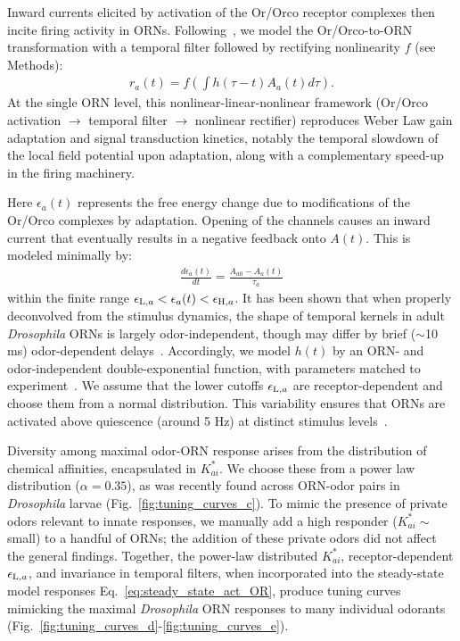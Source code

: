 \documentclass[9pt,twocolumn,twoside,lineno]{pnas-new}
\begin{document}
Inward currents elicited by activation of the Or/Orco receptor complexes then incite firing activity in ORNs. Following~\cite{srinivas_elife}, we model the Or/Orco-to-ORN transformation with a temporal filter followed by rectifying nonlinearity $f$ (see Methods):
\begin{align}
r_a(t) = f\left(\int h(\tau - t)A_a(t) d\tau\right).
\label{eq:steady_state_firing}
\end{align}
At the single ORN level, this nonlinear-linear-nonlinear framework (Or/Orco activation $\rightarrow$ temporal filter $\rightarrow$ nonlinear rectifier) reproduces Weber Law gain adaptation and signal transduction kinetics, notably the temporal slowdown of the local field potential upon adaptation, along with a complementary speed-up in the firing machinery.





Here $\epsilon_a(t)$ represents the free energy change due to modifications of the Or/Orco complexes by adaptation. Opening of the channels causes an inward current that eventually results in a negative feedback onto $A(t)$. This is modeled minimally by:
\begin{align}
\frac{d\epsilon_a(t)}{dt} = \frac{{A}_{a0} - A_a(t)}{\tau_a}
\label{eq:adaptation_dynamics}
\end{align}
within the finite range $\epsilon_{\textup{L}, a} < \epsilon_a(t) < \epsilon_{\textup{H}, a}$. It has been shown that when properly deconvolved from the stimulus dynamics, the shape of temporal kernels in adult \textit{Drosophila} ORNs is largely odor-independent, though may differ by brief ($\sim$10 ms) odor-dependent delays~\cite{martelli}. Accordingly, we model $h(t)$ by an ORN- and odor-independent double-exponential function, with parameters matched to experiment~\cite{martelli}. We assume that the lower cutoffs $\epsilon_{\textup{L}, a}$ are receptor-dependent and choose them from a normal distribution. This variability ensures that ORNs are activated above quiescence (around 5 Hz) at distinct stimulus levels~\cite{srinivas_elife}.  %


Diversity among maximal odor-ORN response arises from the distribution of chemical affinities, encapsulated in $K^*_{ai}$. We choose these from a power law distribution ($\alpha = 0.35$), as was recently found across ORN-odor pairs in \textit{Drosophila} larvae (Fig.~\ref{fig:tuning_curves_c}). To mimic the presence of private odors relevant to innate responses, we manually add a high responder ($K^*_{ai} \sim $ small)  to a handful of ORNs; the addition of these private odors did not affect the general findings. Together, the power-law distributed $K^*_{ai}$, receptor-dependent $\epsilon_{\textup{L}, a}$, and invariance in temporal filters, when incorporated into the steady-state model responses Eq.~\ref{eq:steady_state_act_OR}, produce tuning curves mimicking the maximal \textit{Drosophila} ORN responses to many individual odorants~\cite{hallem_carlson} (Fig.~\ref{fig:tuning_curves_d}-\ref{fig:tuning_curves_e}). 
\end{document}
